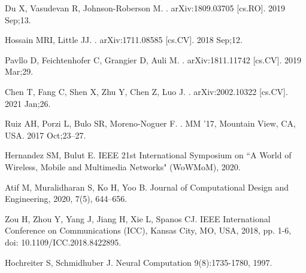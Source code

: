 \documentclass[10pt,letterpaper]{article}
\begin{document}
\begin{thebibliography}{10}
		Du X, Vasudevan R, Johnson-Roberson M.
		.
		\newblock arXiv:1809.03705 [cs.RO]. 2019 Sep;13.
		
		Hossain MRI, Little JJ.
		.
		\newblock arXiv:1711.08585 [cs.CV]. 2018 Sep;12.
		
		Pavllo D, Feichtenhofer C, Grangier D, Auli M.
		.
		\newblock arXiv:1811.11742 [cs.CV]. 2019 Mar;29.
		
		Chen T, Fang C, Shen X, Zhu Y, Chen Z, Luo J.
		.
		\newblock arXiv:2002.10322 [cs.CV]. 2021 Jan;26.
		
		Ruiz AH, Porzi L, Bulo SR, Moreno-Noguer F.
		.
		\newblock MM ’17, Mountain View, CA, USA. 2017 Oct;23–27.
		
		
		Hernandez SM, Bulut E.
		\newblock IEEE 21st International Symposium on ``A World of Wireless, Mobile and Multimedia Networks" (WoWMoM), 2020.
		
		Atif M, Muralidharan S, Ko H, Yoo B.
		\newblock Journal of Computational Design and Engineering, 2020, 7(5), 644–656.
		
		Zou H, Zhou Y, Yang J, Jiang H, Xie L, Spanos CJ.
		 IEEE International Conference on Communications (ICC), Kansas City, MO, USA, 2018, pp. 1-6, doi: 10.1109/ICC.2018.8422895.
		
		Hochreiter S, Schmidhuber J.
		\newblock Neural Computation 9(8):1735-1780, 1997.
		
		
		
		
	\end{thebibliography}
	
	
	
\end{document}
